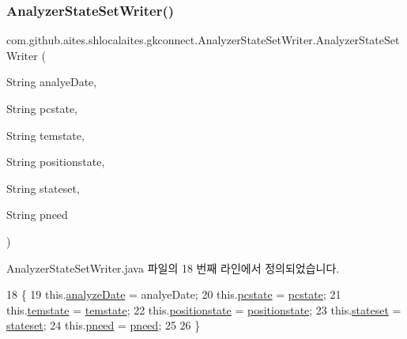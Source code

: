 \subsubsection{\texorpdfstring{Analyzer\+State\+Set\+Writer()}{AnalyzerStateSetWriter()}}
{\footnotesize\ttfamily com.\+github.\+aites.\+shlocalaites.\+gkconnect.\+Analyzer\+State\+Set\+Writer.\+Analyzer\+State\+Set\+Writer (\begin{DoxyParamCaption}\item[{String}]{analye\+Date,  }\item[{String}]{pcstate,  }\item[{String}]{temstate,  }\item[{String}]{positionstate,  }\item[{String}]{stateset,  }\item[{String}]{pneed }\end{DoxyParamCaption})}



Analyzer\+State\+Set\+Writer.\+java 파일의 18 번째 라인에서 정의되었습니다.


\begin{DoxyCode}
18                                                                                                            
                                     \{
19         this.\mbox{\hyperlink{classcom_1_1github_1_1aites_1_1shlocalaites_1_1gkconnect_1_1_analyzer_state_set_writer_a775ad5006162ef24ef79a40a30b0b886}{analyzeDate}} = analyeDate;
20         this.\mbox{\hyperlink{classcom_1_1github_1_1aites_1_1shlocalaites_1_1gkconnect_1_1_analyzer_state_set_writer_ad0d775a45f2ff015d7494105de6968b9}{pcstate}} = \mbox{\hyperlink{classcom_1_1github_1_1aites_1_1shlocalaites_1_1gkconnect_1_1_analyzer_state_set_writer_ad0d775a45f2ff015d7494105de6968b9}{pcstate}};
21         this.\mbox{\hyperlink{classcom_1_1github_1_1aites_1_1shlocalaites_1_1gkconnect_1_1_analyzer_state_set_writer_a15e54040bff7dcf8339e68642e3b4b8b}{temstate}} = \mbox{\hyperlink{classcom_1_1github_1_1aites_1_1shlocalaites_1_1gkconnect_1_1_analyzer_state_set_writer_a15e54040bff7dcf8339e68642e3b4b8b}{temstate}};
22         this.\mbox{\hyperlink{classcom_1_1github_1_1aites_1_1shlocalaites_1_1gkconnect_1_1_analyzer_state_set_writer_aee7af9c2d37cd631c5ee9e36d9028d11}{positionstate}} = \mbox{\hyperlink{classcom_1_1github_1_1aites_1_1shlocalaites_1_1gkconnect_1_1_analyzer_state_set_writer_aee7af9c2d37cd631c5ee9e36d9028d11}{positionstate}};
23         this.\mbox{\hyperlink{classcom_1_1github_1_1aites_1_1shlocalaites_1_1gkconnect_1_1_analyzer_state_set_writer_aba9c1043254afe9abe7dfdb8467b03be}{stateset}} = \mbox{\hyperlink{classcom_1_1github_1_1aites_1_1shlocalaites_1_1gkconnect_1_1_analyzer_state_set_writer_aba9c1043254afe9abe7dfdb8467b03be}{stateset}};
24         this.\mbox{\hyperlink{classcom_1_1github_1_1aites_1_1shlocalaites_1_1gkconnect_1_1_analyzer_state_set_writer_a517da42ac98dcb3578c57ea11f54f8dd}{pneed}} = \mbox{\hyperlink{classcom_1_1github_1_1aites_1_1shlocalaites_1_1gkconnect_1_1_analyzer_state_set_writer_a517da42ac98dcb3578c57ea11f54f8dd}{pneed}};
25         
26     \}
\end{DoxyCode}


